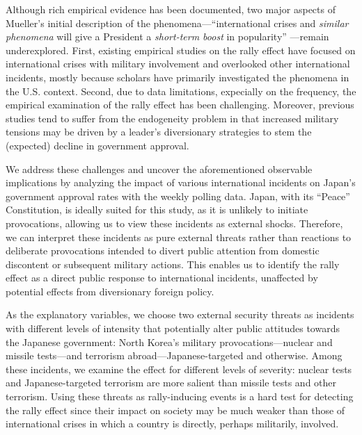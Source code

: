 \documentclass[letterpaper,12pt]{scrartcl}
\begin{document}
Although rich empirical evidence has been documented, two major aspects of Mueller's initial description of the phenomena---``international crises and \textit{similar phenomena} will give a President a \textit{short-term boost} in popularity'' \citep[][p.~20; emphasis added by authors]{Mueller1970APSR}---remain underexplored. First, existing empirical studies on the rally effect have focused on international crises with military involvement and overlooked other international incidents, mostly because scholars have primarily investigated the phenomena in the U.S. context. Second, due to data limitations, expecially on the frequency, the empirical examination of the rally effect has been challenging. Moreover, previous studies tend to suffer from the endogeneity problem in that increased military tensions may be driven by a leader's diversionary strategies to stem the (expected) decline in government approval.



We address these challenges and uncover the aforementioned observable implications by analyzing the impact of various international incidents on Japan's government approval rates with the weekly polling data. Japan, with its ``Peace'' Constitution, is ideally suited for this study, as it is unlikely to initiate provocations, allowing us to view these incidents as external shocks. Therefore, we can interpret these incidents as pure external threats rather than reactions to deliberate provocations intended to divert public attention from domestic discontent or subsequent military actions. This enables us to identify the rally effect as a direct public response to international incidents, unaffected by potential effects from diversionary foreign policy.

As the explanatory variables, we choose two external security threats as incidents with different levels of intensity that potentially alter public attitudes towards the Japanese government: North Korea's military provocations---nuclear and missile tests---and terrorism abroad---Japanese-targeted and otherwise. Among these incidents, we examine the effect for different levels of severity: nuclear tests and Japanese-targeted terrorism are more salient than missile tests and other terrorism. Using these threats as rally-inducing events is a hard test for detecting the rally effect since their impact on society may be much weaker than those of international crises in which a country is directly, perhaps militarily, involved.
\end{document}
